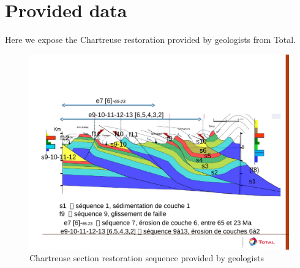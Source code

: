 \documentclass[12pt, a4paper]{report} %
\begin{document}
\section{Provided data}
Here we expose the Chartreuse restoration provided by geologists from Total. 
\begin{figure}[H]
	\centering
	\includegraphics[scale=0.5]{Coupe_Chartreuse_rediscutee.pdf}
	\caption{Chartreuse section restoration sequence provided by geologists}
	\label{chartreuseprovided}
\end{figure}



\end{document}
